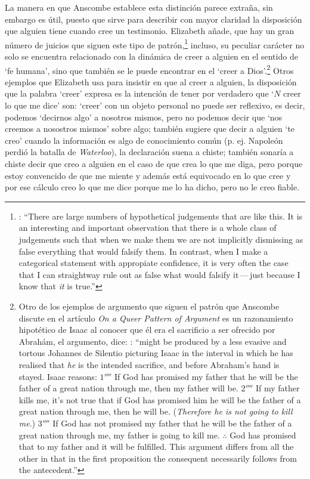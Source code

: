 La manera en que Anscombe establece esta distinción parece extraña, sin embargo es útil, puesto que sirve para describir con mayor claridad la disposición que alguien tiene cuando cree un testimonio. Elizabeth añade, que hay un gran número de juicios que siguen este tipo de patrón,\footnote{\cite[Cf.~][302]{anscombe2015logic:qpa}: \enquote{There are large numbers of hypothetical judgements that are like this. It is an interesting and important observation that there is a whole class of judgements such that when we make them we are not implicitly dismissing as false everything that would falsify them. In contrast, when I make a categorical statement with appropiate confidence, it is very often the case that I can straightway rule out as false what would falsify it\,---\,just because I know that \emph{it} is true.}} incluso, su peculiar carácter no solo se encuentra relacionado con la dinámica de creer a alguien en el sentido de `fe humana', sino que también se le puede encontrar en el `creer a Dios'.\footnote{Otro de los ejemplos de argumento que siguen el patrón que Anscombe discute en el artículo \emph{On a Queer Pattern of Argument} es un razonamiento hipotético de Isaac al conocer que él era el sacrificio a ser ofrecido por Abrahám, el argumento, dice: \cite[Cf.~][309]{anscombe2015logic:qpa}: \enquote{might be produced by a less evasive and tortous Johannes de Silentio picturing Isaac in the interval in which he has realised that \emph{he} is the intended sacrifice, and before Abraham's hand is stayed. Isaac reasons: $1''''$  If God has promised my father that he will be the father of a great nation through me, then my father will be. $2''''$  If my father kills me, it's not true that if God has promised him he will be the father of a great nation through me, then he will be. (\emph{Therefore he is not going to kill me}.) $3''''$  If God has not promised my father that he will be the father of a great nation through me, my father is going to kill me. $\mathbf{\therefore}$  God has promised that to my father and it will be fulfilled. This argument differs from all the other in that in the first proposition the consequent necessarily follows from the antecedent.}} Otros ejemplos que Elizabeth usa para insistir en que al creer a alguien, la disposición que la palabra `creer' expresa es la intención de tener por verdadero que \enquote*{$N$ creer lo que me dice} son: `creer' con un objeto personal no puede ser reflexivo, es decir, podemos `decirnos algo' a nosotros mismos, pero no podemos decir que `nos creemos a nosostros mismos' sobre algo; también sugiere que decir a alguien \enquote*{te creo} cuando la información es algo de conocimiento común (p. ej. Napoleón perdió la batalla de \emph{Waterloo}), la declaración suena a chiste; también sonaría a chiste decir que creo a alguien en el caso de que crea lo que me diga, pero porque estoy convencido de que me miente y además está equivocado en lo que cree y por ese cálculo creo lo que me dice porque me lo ha dicho, pero no le creo fiable.

